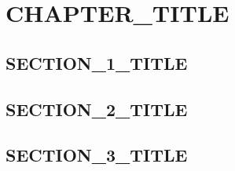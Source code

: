 %
\chapter{{{CHAPTER_TITLE}}}
\label{chap:{{CHAPTER_LABEL}}}


\section{{{SECTION_1_TITLE}}}
\label{sec:{{SECTION_1_LABEL}}}


\section{{{SECTION_2_TITLE}}}
\label{sec:{{SECTION_2_LABEL}}}


\section{{{SECTION_3_TITLE}}}
\label{sec:{{SECTION_3_LABEL}}}

